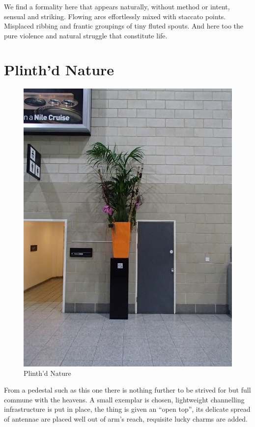 \documentclass{book}
\begin{document}
We find a formality here that appears naturally, without method or intent,
sensual and striking. Flowing arcs effortlessly mixed with staccato points.
Misplaced ribbing and frantic groupings of tiny fluted spouts. And here too
the pure violence and natural struggle that constitute life.

\chapter{Plinth'd Nature}

\begin{figure}
\centering
\includegraphics[width=\textwidth,angle=90]{figures/P1050143.JPG}
\caption{Plinth'd Nature}
\end{figure}

From a pedestal such as this one there is nothing further to be strived for but
full commune with the heavens. A small exemplar is chosen, lightweight
channelling infrastructure is put in place, the thing is given an ``open top'',
its delicate spread of antennae are placed well out of arm's reach, requisite
lucky charms are added.
\end{document}
